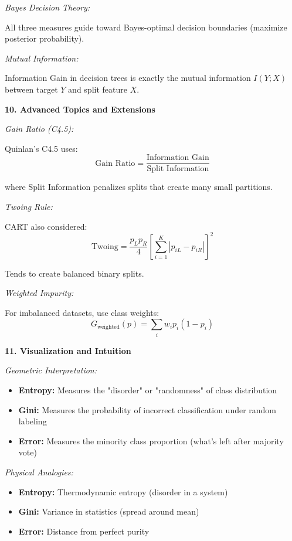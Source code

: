 \documentclass[12pt]{article}
\begin{document}
\begin{explanation}
\textit{Bayes Decision Theory:}

All three measures guide toward Bayes-optimal decision boundaries (maximize posterior probability).

\textit{Mutual Information:}

Information Gain in decision trees is exactly the mutual information $I(Y; X)$ between target $Y$ and split feature $X$.

\textbf{10. Advanced Topics and Extensions}

\textit{Gain Ratio (C4.5):}

Quinlan's C4.5 uses:
\[
\text{Gain Ratio} = \frac{\text{Information Gain}}{\text{Split Information}}
\]

where Split Information penalizes splits that create many small partitions.

\textit{Twoing Rule:}

CART also considered:
\[
\text{Twoing} = \frac{p_L p_R}{4} \left[\sum_{i=1}^{K} |p_{iL} - p_{iR}|\right]^2
\]

Tends to create balanced binary splits.

\textit{Weighted Impurity:}

For imbalanced datasets, use class weights:
\[
G_{\text{weighted}}(p) = \sum_{i} w_i p_i (1 - p_i)
\]

\textbf{11. Visualization and Intuition}

\textit{Geometric Interpretation:}

\begin{itemize}
    \item \textbf{Entropy:} Measures the "disorder" or "randomness" of class distribution
    \item \textbf{Gini:} Measures the probability of incorrect classification under random labeling
    \item \textbf{Error:} Measures the minority class proportion (what's left after majority vote)
\end{itemize}

\textit{Physical Analogies:}

\begin{itemize}
    \item \textbf{Entropy:} Thermodynamic entropy (disorder in a system)
    \item \textbf{Gini:} Variance in statistics (spread around mean)
    \item \textbf{Error:} Distance from perfect purity
\end{itemize}


\end{explanation}
\end{document}
